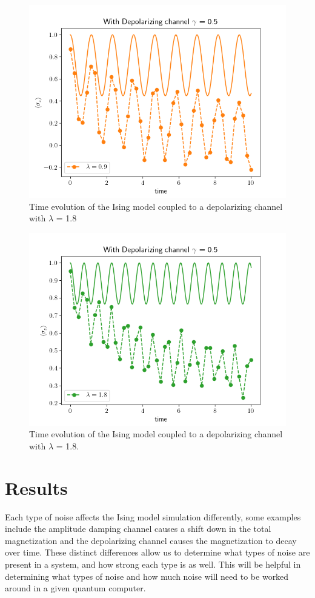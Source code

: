 \documentclass[12pt]{article}
\begin{document}
\begin{figure}[!htb]
    \centering
    \includegraphics[width=\textwidth]{images/DepolChannelLambda09.png}
    \caption{Time evolution of the Ising model coupled to a depolarizing channel with $\lambda$ = 1.8%
      \label{fig:DepolChannelLambda09}}
  \end{figure}

\begin{figure}[!htb]
    \centering
    \includegraphics[width=\textwidth]{images/DepolChannelLambda18.png}
    \caption{Time evolution of the Ising model coupled to a depolarizing channel with $\lambda$ = 1.8.%
      \label{fig:DepolChannelLambda18}}
  \end{figure}

  \section{Results}

 Each type of noise affects the Ising model simulation differently, some examples include the amplitude damping channel causes a shift down in the total magnetization and the depolarizing channel causes the magnetization to decay over time. These distinct differences allow us to determine what types of noise are present in a system, and how strong each type is as well. This will be helpful in determining what types of noise and how much noise will need to be worked around in a given quantum computer.
  \printbibliography
\end{document}

